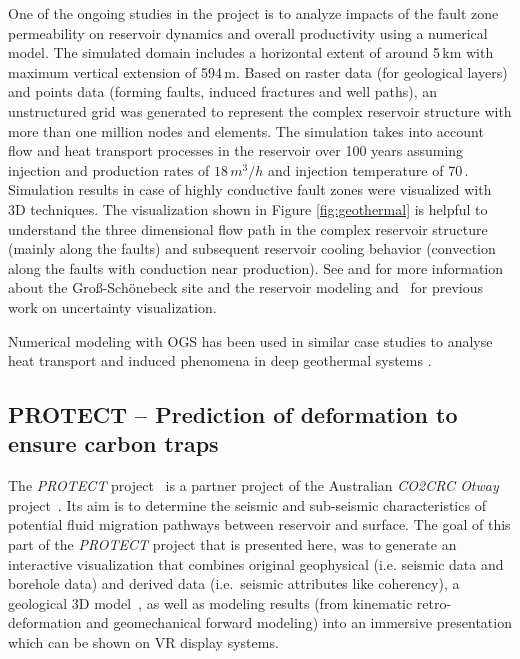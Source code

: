 \documentclass[twocolumn]{svjour3}          %
\begin{document}
One of the ongoing studies in the project is to analyze impacts of the fault zone permeability on reservoir dynamics and overall productivity using a numerical model. The simulated domain includes a horizontal extent of around 5\,km with maximum vertical extension of 594\,m. Based on raster data (for geological layers) and points data (forming faults, induced fractures and well paths), an unstructured grid was generated to represent the complex reservoir structure with more than one million nodes and elements. The simulation takes into account flow and heat transport processes in the reservoir over 100 years assuming injection and production rates of $18\,m^3/h$ and injection temperature of 70\,\celsius. Simulation results in case of highly conductive fault zones were visualized with 3D techniques. The visualization shown in Figure \ref{fig:geothermal} is helpful to understand the three dimensional flow path in the complex reservoir structure (mainly along the faults) and subsequent reservoir cooling behavior (convection along the faults with conduction near production). See \cite{zimmermann:geothermal} and \cite{bloecher:geothermal} for more information about the Gro{\ss}-Sch\"onebeck site and the reservoir modeling and~\cite{zehner:uncertainty} for previous work on uncertainty visualization.

Numerical modeling with OGS has been used in similar case studies to analyse heat transport and induced phenomena in deep geothermal systems \cite{Kolditz1993467, McDermott2006321, Watanabe2010263}.


\subsection{PROTECT -- Prediction of deformation to ensure carbon traps}
\label{otway-basin---co2-storage}

The \emph{PROTECT} project~\cite{krawczyk:deformation} is a partner project of the Australian \emph{CO2CRC Otway} project~\cite{cook:carbon}. Its aim is to determine the seismic and sub-seismic characteristics of potential fluid migration pathways between reservoir and surface. The goal of this part of the \emph{PROTECT} project that is presented here, was to generate an interactive visualization that combines original geophysical (i.e. seismic data and borehole data) and derived data (i.e.~seismic attributes like coherency), a geological 3D model~\cite{ziesch:geology}, as well as modeling results (from kinematic retro-deformation and geomechanical forward modeling) into an immersive presentation which can be shown on VR display systems.
\end{document}
